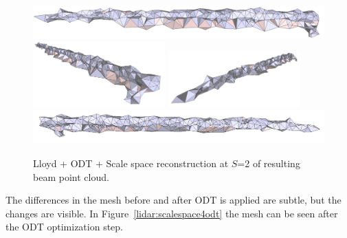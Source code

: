 \documentclass[12pt]{drexelthesis}
\begin{document}
\begin{figure}[!ht]
	\centering
		\includegraphics[width=5in]{real-lab-scans/optimizedNeat/scalespace2odt00.png}
		\includegraphics[width=2in]{real-lab-scans/optimizedNeat/scalespace2odt01.png}
		\includegraphics[width=2in]{real-lab-scans/optimizedNeat/scalespace2odt02.png}
		\includegraphics[width=5in]{real-lab-scans/optimizedNeat/scalespace2odt03.png}
		\caption[Lloyd + ODT +Scale space reconstruction at $S$=2 of segmented LiDAR data]{\centering Lloyd + ODT + Scale space reconstruction at $S$=2 of resulting beam point cloud.}
	\label{lidar:scalespace2odt}
\end{figure}

The differences in the mesh before and after ODT is applied are subtle, but the changes are visible. In Figure~\ref{lidar:scalespace4odt} the mesh can be seen after the ODT optimization step. %
\end{document}

